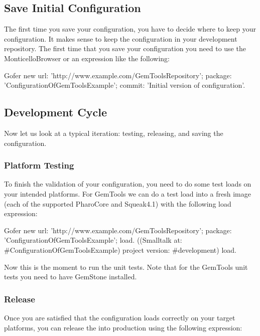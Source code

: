 \documentclass[a4paper,10pt,twoside]{book}
\begin{document}
\subsection{Save Initial Configuration}

The first time you save your configuration, you have to decide where to keep your configuration. It makes sense to keep the configuration in your development repository. The first time that you save your configuration you need to use the MonticelloBrowser or an expression like the following:

\begin{code}{}
  Gofer new
     url: 'http://www.example.com/GemToolsRepository';
     package: 'ConfigurationOfGemToolsExample';
     commit: 'Initial version of configuration'.
\end{code}     


\subsection{Development Cycle}
Now let us look at a typical iteration: testing, releasing, and saving the configuration.
 
\subsubsection{Platform Testing}
To finish the validation of your configuration, you need to do some test loads on your intended platforms. For GemTools we can do a test load into a fresh image (each of the supported PharoCore and Squeak4.1) with the following load expression:

\begin{code}{}
Gofer new
  url: 'http://www.example.com/GemToolsRepository';
  package: 'ConfigurationOfGemToolsExample';
  load.
((Smalltalk at: #ConfigurationOfGemToolsExample)
     project version: #development) load.
\end{code}     
     
Now this is the moment to run the unit tests. Note that for the GemTools unit tests you need to have GemStone installed.

\subsubsection{Release}
Once you are satisfied that the configuration loads correctly on your target platforms, you can release the  into production using the following expression:
\end{document}
